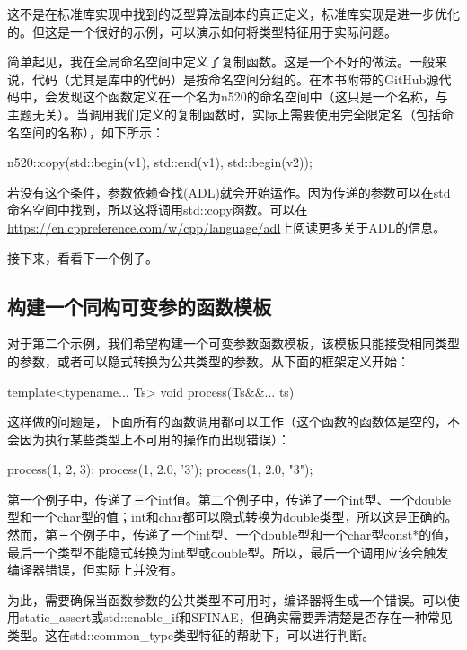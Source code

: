 这不是在标准库实现中找到的泛型算法副本的真正定义，标准库实现是进一步优化的。但这是一个很好的示例，可以演示如何将类型特征用于实际问题。

简单起见，我在全局命名空间中定义了复制函数。这是一个不好的做法。一般来说，代码（尤其是库中的代码）是按命名空间分组的。在本书附带的GitHub源代码中，会发现这个函数定义在一个名为n520的命名空间中（这只是一个名称，与主题无关）。当调用我们定义的复制函数时，实际上需要使用完全限定名（包括命名空间的名称），如下所示：

\begin{cppcode}
n520::copy(std::begin(v1), std::end(v1), std::begin(v2));
\end{cppcode}

若没有这个条件，参数依赖查找(ADL)就会开始运作。因为传递的参数可以在std命名空间中找到，所以这将调用std::copy函数。可以在\url{https://en.cppreference.com/w/cpp/language/adl}上阅读更多关于ADL的信息。

接下来，看看下一个例子。

\subsection{构建一个同构可变参的函数模板}

对于第二个示例，我们希望构建一个可变参数函数模板，该模板只能接受相同类型的参数，或者可以隐式转换为公共类型的参数。从下面的框架定义开始：

\begin{cppcode}
template<typename... Ts>
void process(Ts&&... ts) {}
\end{cppcode}

这样做的问题是，下面所有的函数调用都可以工作（这个函数的函数体是空的，不会因为执行某些类型上不可用的操作而出现错误）：

\begin{cppcode}
process(1, 2, 3);
process(1, 2.0, '3');
process(1, 2.0, "3");
\end{cppcode}

第一个例子中，传递了三个int值。第二个例子中，传递了一个int型、一个double型和一个char型的值；int和char都可以隐式转换为double类型，所以这是正确的。然而，第三个例子中，传递了一个int型、一个double型和一个char型const*的值，最后一个类型不能隐式转换为int型或double型。所以，最后一个调用应该会触发编译器错误，但实际上并没有。

为此，需要确保当函数参数的公共类型不可用时，编译器将生成一个错误。可以使用static_assert或std::enable_if和SFINAE，但确实需要弄清楚是否存在一种常见类型。这在std::common_type类型特征的帮助下，可以进行判断。

